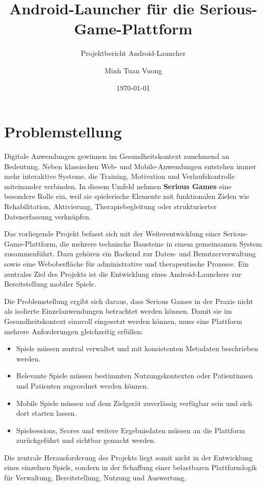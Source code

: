 \documentclass[a4paper,10pt,ngerman]{INSOproject}
\title{Android-Launcher für die Serious-Game-Plattform}
\subtitle{Projektbericht Android-Launcher}
\author{Minh Tuan Vuong}
\date{\today}
\begin{document}
\maketitle
\tableofcontents
\newpage

\section{Problemstellung}
Digitale Anwendungen gewinnen im Gesundheitskontext zunehmend an Bedeutung. Neben klassischen Web- und Mobile-Anwendungen entstehen immer mehr interaktive Systeme, die Training, Motivation und Verlaufskontrolle miteinander verbinden. In diesem Umfeld nehmen \textbf{Serious Games} eine besondere Rolle ein, weil sie spielerische Elemente mit funktionalen Zielen wie Rehabilitation, Aktivierung, Therapiebegleitung oder strukturierter Datenerfassung verknüpfen.

Das vorliegende Projekt befasst sich mit der Weiterentwicklung einer Serious-Game-Plattform, die mehrere technische Bausteine in einem gemeinsamen System zusammenführt. Dazu gehören ein Backend zur Daten- und Benutzerverwaltung sowie eine Weboberfläche für administrative und therapeutische Prozesse. Ein zentrales Ziel des Projekts ist die Entwicklung eines Android-Launchers zur Bereitstellung mobiler Spiele.

Die Problemstellung ergibt sich daraus, dass Serious Games in der Praxis nicht als isolierte Einzelanwendungen betrachtet werden können. Damit sie im Gesundheitskontext sinnvoll eingesetzt werden können, muss eine Plattform mehrere Anforderungen gleichzeitig erfüllen:

\begin{itemize}
  \item Spiele müssen zentral verwaltet und mit konsistenten Metadaten beschrieben werden.
  \item Relevante Spiele müssen bestimmten Nutzungskontexten oder Patientinnen und Patienten zugeordnet werden können.
  \item Mobile Spiele müssen auf dem Zielgerät zuverlässig verfügbar sein und sich dort starten lassen.
  \item Spielsessions, Scores und weitere Ergebnisdaten müssen an die Plattform zurückgeführt und sichtbar gemacht werden.
\end{itemize}

Die zentrale Herausforderung des Projekts liegt somit nicht in der Entwicklung eines einzelnen Spiels, sondern in der Schaffung einer belastbaren Plattformlogik für Verwaltung, Bereitstellung, Nutzung und Auswertung.
\end{document}
